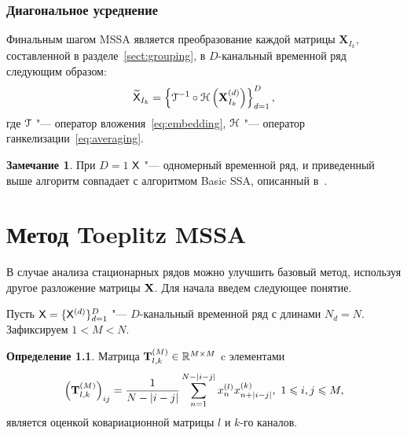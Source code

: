 \documentclass[specialist,
substylefile = spbu_report.rtx,
subf,href,colorlinks=true, 12pt]{disser}
\newcommand{\traj}{\mathbf{X}}
\theoremstyle{definition}
\newtheorem{definition}{Определение}
\newtheorem{remark}{Замечание}
\begin{document}
\subsection{Диагональное усреднение}\label{sect:averaging}
Финальным шагом MSSA является преобразование каждой матрицы $\traj_{I_k}$, составленной в разделе~\ref{sect:grouping}, в $D$-канальный временной ряд следующим образом:
\begin{equation}
	\widetilde{\mathsf{X}}_{I_k}=\left\{\EuScript{T}^{-1}\circ\EuScript{H}\left(\mathbf{X}_{I_k}^{(d)}\right)\right\}_{d=1}^D,
\end{equation}
где $\EuScript{T}$ "--- оператор вложения~\eqref{eq:embedding}, $\EuScript{H}$ "--- оператор ганкелизации~\eqref{eq:averaging}.


\begin{remark}
При $D=1$ $\mathsf{X}$ "--- одномерный временной ряд, и приведенный выше алгоритм совпадает с алгоритмом Basic SSA, описанный в~\cite{ssa_an}.
\end{remark}

\chapter{Метод Toeplitz MSSA}\label{toeplitz}
В случае анализа стационарных рядов можно улучшить базовый метод, используя другое разложение матрицы $\mathbf{X}$. Для начала введем следующее понятие.

Пусть $\mathsf{X}=\{\mathsf{X}^{(d)}\}_{d=1}^D$ "--- $D$-канальный временной ряд с длинами $N_d=N$. Зафиксируем $1<M<N$.
\begin{definition}
	Матрица $\mathbf{T}_{l,k}^{(M)}\in \mathbb{R}^{M\times M}$ c элементами
	\begin{equation*}\label{eq:block_elements}
		\left(\mathbf{T}^{(M)}_{l,k}\right)_{ij}=\frac{1}{N-|i-j|}\sum_{n=1}^{N-|i-j|} x^{(l)}_nx^{(k)}_{n+|i-j|},\ 1\leqslant i,j\leqslant M,
	\end{equation*}
	является оценкой ковариационной матрицы $l$ и $k$-го каналов.
\end{definition}
\end{document}
